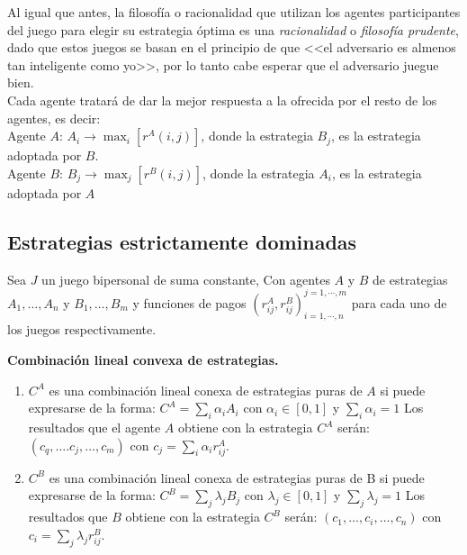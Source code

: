 Al igual que antes, la filosofía o racionalidad que utilizan los agentes participantes del juego para elegir su estrategia óptima es una \textit{racionalidad} o \textit{filosofía prudente}, dado que estos juegos se basan en el principio de que <<el adversario es almenos tan inteligente como yo>>, por lo tanto cabe esperar que el adversario juegue bien.
\\
Cada agente tratará de dar la mejor respuesta a la ofrecida por el resto de los agentes, es decir:
\\
Agente $A$: $A_i \rightarrow {\max}_i [r^A(i,j)]$, donde la estrategia $B_j$, es la estrategia adoptada por $B$.\\
Agente $B$: $B_j \rightarrow {\max}_j [r^B(i,j)]$, donde la estrategia $A_i$, es la estrategia adoptada por $A$
\\
\subsection{Estrategias estrictamente dominadas}
Sea $J$ un juego bipersonal de suma constante, Con agentes $A$ y $B$ de estrategias $A_1,\ldots,A_n$ y $B_1,\ldots,B_m$ y funciones de pagos $\left( r_{ij}^A,r_{ij}^B \right)_{i=1, \cdots ,n}^{j=1, \cdots, m} $ para cada uno de los juegos respectivamente.

\begin{definicion}
\textbf{Combinación lineal convexa de estrategias.}

\begin{enumerate}
    \item $C^A$ es una combinación lineal conexa de estrategias puras de $A$ si puede expresarse de la forma: $C^A = \underset{i}{\sum}\alpha_iA_i $ con $ \alpha_i \in [0,1]$ y $ \underset{i}{\sum}\alpha_i=1$ Los resultados que el agente $A$ obtiene con la estrategia $C^A$ serán: 
    $(c_q,\ldots.c_j,\ldots,c_m)$ con $c_j = \underset{i}{\sum}\alpha_i r_{ij}^A$. 
\item $C^B$ es una combinación lineal conexa de estrategias puras de B si puede expresarse de la forma: $C^B = \underset{j}{\sum}\lambda_jB_j $ con $\lambda_j \in [0,1]$ y $\underset{j}{\sum}\lambda_j=1$ Los resultados que $B$ obtiene con la estrategia $C^B$ serán: $(c_1,\ldots,c_i,\ldots,c_n)$ con $c_i = \underset{j}{\sum}\lambda_jr_{ij}^B$.
    
\end{enumerate}

\end{definicion}

